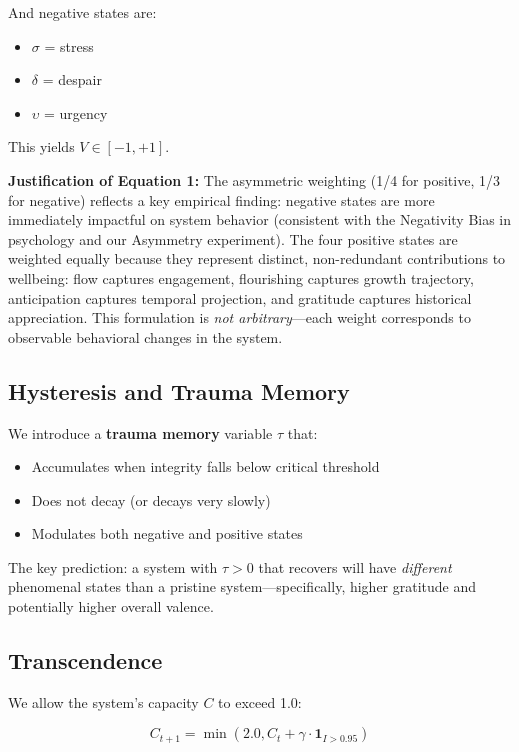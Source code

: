 \documentclass[a4paper,11pt,twocolumn]{article}
\begin{document}
And negative states are:
\begin{itemize}
    \item $\sigma$ = stress
    \item $\delta$ = despair
    \item $\upsilon$ = urgency
\end{itemize}

This yields $V \in [-1, +1]$.

\textbf{Justification of Equation 1:} The asymmetric weighting (1/4 for positive, 1/3 for negative) reflects a key empirical finding: negative states are more immediately impactful on system behavior (consistent with the Negativity Bias in psychology and our Asymmetry experiment). The four positive states are weighted equally because they represent distinct, non-redundant contributions to wellbeing: flow captures engagement, flourishing captures growth trajectory, anticipation captures temporal projection, and gratitude captures historical appreciation. This formulation is \textit{not arbitrary}---each weight corresponds to observable behavioral changes in the system.

\subsection{Hysteresis and Trauma Memory}

We introduce a \textbf{trauma memory} variable $\tau$ that:
\begin{itemize}
    \item Accumulates when integrity falls below critical threshold
    \item Does not decay (or decays very slowly)
    \item Modulates both negative and positive states
\end{itemize}

The key prediction: a system with $\tau > 0$ that recovers will have \textit{different} phenomenal states than a pristine system---specifically, higher gratitude and potentially higher overall valence.

\subsection{Transcendence}

We allow the system's capacity $C$ to exceed 1.0:

\begin{equation}
C_{t+1} = \min(2.0, C_t + \gamma \cdot \mathbf{1}_{I > 0.95})
\end{equation}
\end{document}
